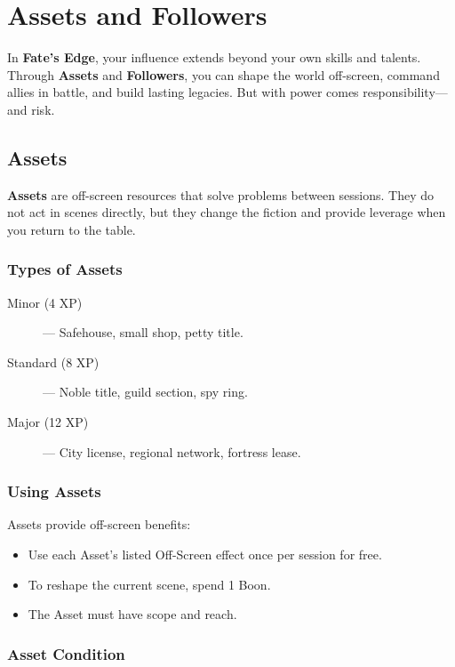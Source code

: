 
\chapter{Assets and Followers}

In \textbf{Fate's Edge}, your influence extends beyond your own skills and talents. Through \textbf{Assets} and \textbf{Followers}, you can shape the world off-screen, command allies in battle, and build lasting legacies. But with power comes responsibility—and risk.

\section{Assets}

\textbf{Assets} are off-screen resources that solve problems between sessions. They do not act in scenes directly, but they change the fiction and provide leverage when you return to the table.

\subsection*{Types of Assets}

\begin{description}
  \item[Minor (4 XP)] — Safehouse, small shop, petty title.
  \item[Standard (8 XP)] — Noble title, guild section, spy ring.
  \item[Major (12 XP)] — City license, regional network, fortress lease.
\end{description}

\subsection*{Using Assets}

Assets provide off-screen benefits:

\begin{itemize}
  \item Use each Asset's listed Off-Screen effect once per session for free.
  \item To reshape the current scene, spend 1 Boon.
  \item The Asset must have scope and reach.
\end{itemize}

\subsection*{Asset Condition}

